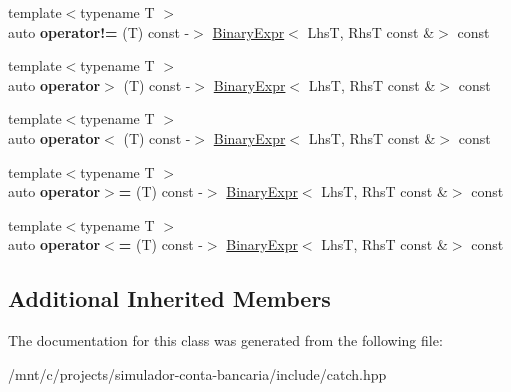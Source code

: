 \begin{DoxyCompactItemize}
{\footnotesize template$<$typename T $>$ }\\auto {\bfseries operator!=} (T) const -\/$>$ \hyperlink{classCatch_1_1BinaryExpr}{Binary\+Expr}$<$ LhsT, RhsT const \&$>$ const
\item 
\mbox{\label{classCatch_1_1BinaryExpr_a70b66bfaa6df6f8d04e243fda3e0e1e4}} 
{\footnotesize template$<$typename T $>$ }\\auto {\bfseries operator$>$} (T) const -\/$>$ \hyperlink{classCatch_1_1BinaryExpr}{Binary\+Expr}$<$ LhsT, RhsT const \&$>$ const
\item 
\mbox{\label{classCatch_1_1BinaryExpr_a8328cde75134e02d7d44c5277db96c09}} 
{\footnotesize template$<$typename T $>$ }\\auto {\bfseries operator$<$} (T) const -\/$>$ \hyperlink{classCatch_1_1BinaryExpr}{Binary\+Expr}$<$ LhsT, RhsT const \&$>$ const
\item 
\mbox{\label{classCatch_1_1BinaryExpr_a334b84ac38c19c7c961a6d974a6c7d73}} 
{\footnotesize template$<$typename T $>$ }\\auto {\bfseries operator$>$=} (T) const -\/$>$ \hyperlink{classCatch_1_1BinaryExpr}{Binary\+Expr}$<$ LhsT, RhsT const \&$>$ const
\item 
\mbox{\label{classCatch_1_1BinaryExpr_a8773a729df3a465cad4e270e912db436}} 
{\footnotesize template$<$typename T $>$ }\\auto {\bfseries operator$<$=} (T) const -\/$>$ \hyperlink{classCatch_1_1BinaryExpr}{Binary\+Expr}$<$ LhsT, RhsT const \&$>$ const
\end{DoxyCompactItemize}
\subsection*{Additional Inherited Members}


The documentation for this class was generated from the following file\+:\begin{DoxyCompactItemize}
\item 
/mnt/c/projects/simulador-\/conta-\/bancaria/include/catch.\+hpp\end{DoxyCompactItemize}
